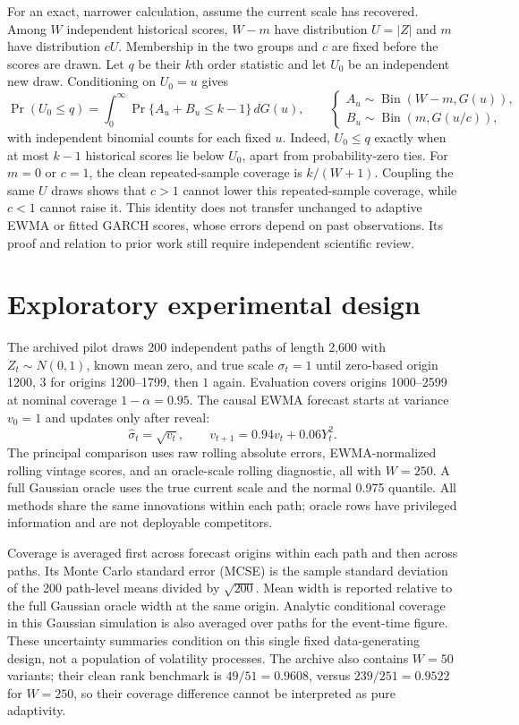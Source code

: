 \documentclass[11pt]{article}
\begin{document}
For an exact, narrower calculation, assume the current scale has recovered.
Among $W$ independent historical scores, $W-m$ have distribution $U=|Z|$ and
$m$ have distribution $cU$. Membership in the two groups and $c$ are fixed
before the scores are drawn. Let $q$ be their $k$th order statistic and let
$U_0$ be an independent new draw. Conditioning on $U_0=u$ gives
\begin{equation}
 \Pr(U_0\leq q)=\int_0^\infty
 \Pr\{A_u+B_u\leq k-1\}\,dG(u),\qquad
 \begin{cases}
 A_u\sim\operatorname{Bin}(W-m,G(u)),\\
 B_u\sim\operatorname{Bin}(m,G(u/c)),
 \end{cases}
 \label{eq:contamination}
\end{equation}
with independent binomial counts for each fixed $u$. Indeed, $U_0\leq q$
exactly when at most $k-1$ historical scores lie below $U_0$, apart from
probability-zero ties. For $m=0$ or $c=1$, the clean repeated-sample coverage
is $k/(W+1)$. Coupling the same $U$ draws shows that $c>1$ cannot lower this
repeated-sample coverage, while $c<1$ cannot raise it. This identity
does not transfer unchanged to adaptive EWMA or fitted GARCH scores, whose
errors depend on past observations. Its proof and relation to prior work still
require independent scientific review.

\section{Exploratory experimental design}
The archived pilot draws 200 independent paths of length 2,600 with
$Z_t\sim N(0,1)$, known mean zero, and true scale $\sigma_t=1$ until
zero-based origin 1200, $3$ for origins 1200--1799, then $1$ again. Evaluation
covers origins 1000--2599 at nominal coverage $1-\alpha=0.95$. The causal
EWMA forecast starts at variance $v_0=1$ and updates only after reveal:
\[
 \widehat\sigma_t=\sqrt{v_t},\qquad
 v_{t+1}=0.94v_t+0.06Y_t^2.
\]
The principal comparison uses raw rolling absolute errors, EWMA-normalized
rolling vintage scores, and an oracle-scale rolling diagnostic, all with
$W=250$. A full Gaussian oracle uses the true current scale and the normal
0.975 quantile. All methods share the same innovations within each path;
oracle rows have privileged information and are not deployable competitors.

Coverage is averaged first across forecast origins within each path and then
across paths. Its Monte Carlo standard error (MCSE) is the sample standard
deviation of the 200 path-level means divided by $\sqrt{200}$. Mean width is
reported relative to the full Gaussian oracle width at the same origin.
Analytic conditional coverage in this Gaussian simulation is also averaged
over paths for the event-time figure. These uncertainty summaries condition
on this single fixed data-generating design, not a population of
volatility processes. The archive also contains $W=50$ variants; their clean
rank benchmark is $49/51=0.9608$, versus $239/251=0.9522$ for $W=250$,
so their coverage difference cannot be interpreted as pure adaptivity.
\end{document}
